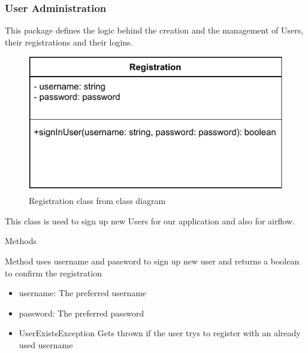 \subsubsection{User Administration}
This package defines the logic behind the creation and the management of Users, their registrations and their logins.



\begin{figure}[H]
\centerline{\includegraphics[scale=1]{res/Klassen/RegistrationClass.pdf}}
\caption{Registration class from class diagram}
\end{figure}

This class is used to sign up new Users for our application and also for airflow.


\begin{methodenv}{Methods}


Method uses username and password to sign up new user and returns a boolean to confirm the registration

\begin{itemize}
	\item{username:}
	The preferred username
	\item{password:}
	The preferred password
\end{itemize}

\begin{itemize}
	\item{UserExistsException}
	Gets thrown if the user trys to register with an already used username
\end{itemize}
\end{methodenv}



